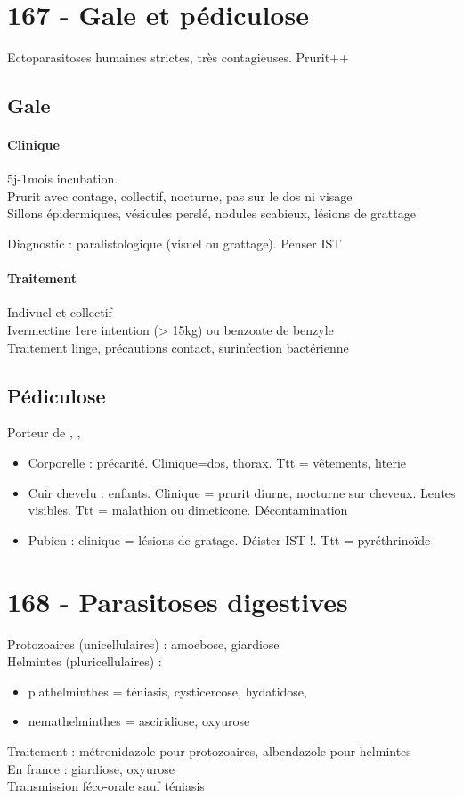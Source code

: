 \section{167 - Gale et pédiculose}

Ectoparasitoses humaines strictes, très contagieuses. Prurit++

\subsection{Gale}
\paragraph{Clinique} 5j-1mois incubation.\\
Prurit avec contage, collectif, nocturne, pas sur le dos ni visage\\
Sillons épidermiques, vésicules perslé, nodules scabieux, lésions de grattage

Diagnostic : paralistologique (visuel ou grattage). Penser IST

\paragraph{Traitement} 
Indivuel et collectif\\
Ivermectine 1ere intention (> 15kg) ou benzoate de benzyle\\
Traitement linge, précautions contact, surinfection bactérienne

\subsection{Pédiculose}
Porteur de , , 

\begin{itemize}
  \item Corporelle : précarité. Clinique=dos, thorax. Ttt = vêtements, literie
    \item Cuir chevelu : enfants. Clinique = prurit diurne, nocturne sur
      cheveux. Lentes visibles. Ttt = malathion ou dimeticone. Décontamination
      \item Pubien : clinique = lésions de gratage. Déister IST !. Ttt = pyréthrinoïde
\end{itemize}

\section{168 - Parasitoses digestives}
Protozoaires (unicellulaires) : amoebose, giardiose\\
Helmintes (pluricellulaires) : 
\begin{itemize}
  \item plathelminthes = téniasis, cysticercose, hydatidose, 
  \item nemathelminthes = asciridiose, oxyurose
\end{itemize}
Traitement : métronidazole pour protozoaires, albendazole pour helmintes\\
En france : giardiose, oxyurose\\
Transmission féco-orale sauf téniasis

